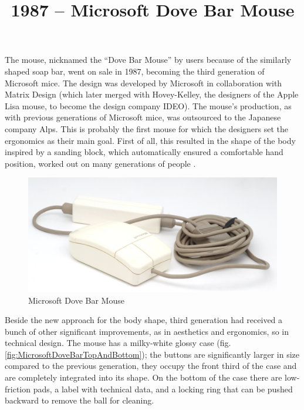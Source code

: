 \documentclass[11pt, a4paper]{article}
\begin{document}
\title{1987 -- Microsoft Dove Bar Mouse}
\date{}
\maketitle
{}

The mouse, nicknamed the ``Dove Bar Mouse'' by users because of the similarly shaped soap bar, went on sale in 1987, becoming the third generation of Microsoft mice. The design was developed by Microsoft in collaboration with Matrix Design (which later merged with Hovey-Kelley, the designers of the Apple Lisa mouse, to become the design company IDEO). The mouse's production, as with previous generations of Microsoft mice, was outsourced to the Japanese company Alps. This is probably the first mouse for which the designers set the ergonomics as their main goal. First of all, this resulted in the shape of the body inspired by a sanding block, which automatically ensured a comfortable hand position, worked out on many generations of people \cite{doveBarDesign1, atkinson}.

\begin{figure}[h]
   \centering
    \includegraphics[scale=0.55]{1987_microsoft_dove_bar_mouse/pic_30.jpg}
    \caption{Microsoft Dove Bar Mouse}
    \label{fig:MicrosoftDoveBarPic}
\end{figure}

Beside the new approach for the body shape, third generation had received a bunch of other significant improvements, as in aesthetics and ergonomics, so in technical design. The mouse has a milky-white glossy case (fig. \ref{fig:MicrosoftDoveBarTopAndBottom}); the buttons are significantly larger in size compared to the previous generation, they occupy the front third of the case and are completely integrated into its shape. On the bottom of the case there are low-friction pads, a label with technical data, and a locking ring that can be pushed backward to remove the ball for cleaning.
\end{document}
